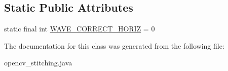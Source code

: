 \subsection*{Static Public Attributes}
\begin{DoxyCompactItemize}
\item 
static final int \hyperlink{group__stitching__rotation_ga5b86272961257cad2cfb216bf6ca414b}{W\+A\+V\+E\+\_\+\+C\+O\+R\+R\+E\+C\+T\+\_\+\+H\+O\+R\+IZ} = 0
\end{DoxyCompactItemize}


The documentation for this class was generated from the following file\+:\begin{DoxyCompactItemize}
\item 
opencv\+\_\+stitching.\+java\end{DoxyCompactItemize}

